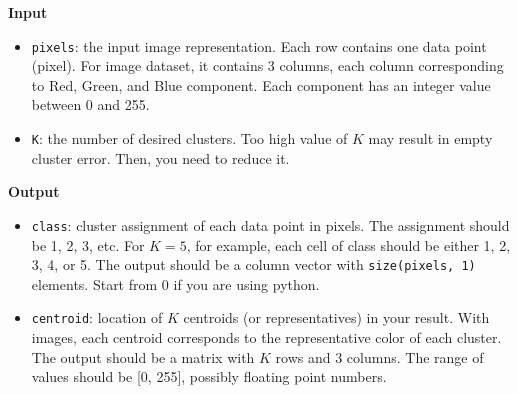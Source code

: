 \documentclass[twoside,10pt]{article}
\begin{document}
\textbf{Input}
\begin{itemize}
  \item \texttt{pixels}: the input image representation. Each row contains one data point (pixel). For image dataset, it contains 3 columns, each column corresponding to Red, Green, and Blue component. Each component has an integer value between 0 and 255.
  \item \texttt{K}: the number of desired clusters. Too high value of $K$ may result in empty cluster error. Then, you need to reduce it.
\end{itemize}

\textbf{Output}
\begin{itemize}
  \item \texttt{class}: cluster assignment of each data point in pixels. The assignment should be 1, 2, 3, etc. For $K = 5$, for example, each cell of class should be either 1, 2, 3, 4, or 5. The output should be a column vector with \texttt{size(pixels, 1)} elements. Start from 0 if you are using python.
  \item \texttt{centroid}: location of $K$ centroids (or representatives) in your result. With images, each centroid corresponds to the representative color of each cluster. The output should be a matrix with $K$ rows and 3 columns. The range of values should be [0, 255], possibly floating point numbers.
\end{itemize}
\end{document}
